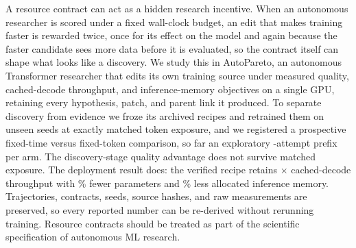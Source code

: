 A resource contract can act as a hidden research incentive.
When an autonomous researcher is scored under a fixed wall-clock budget, an edit that makes training faster is rewarded twice, once for its effect on the model and again because the faster candidate sees more data before it is evaluated, so the contract itself can shape what looks like a discovery.
We study this in AutoPareto, an autonomous Transformer researcher that edits its own training source under measured quality, cached-decode throughput, and inference-memory objectives on a single GPU, retaining every hypothesis, patch, and parent link it produced.
To separate discovery from evidence we froze its archived recipes and retrained them on unseen seeds at exactly matched token exposure, and we registered a prospective fixed-time versus fixed-token comparison, so far an exploratory \TimeN{}-attempt prefix per arm.
The discovery-stage quality advantage does not survive matched exposure.
The deployment result does: the verified recipe retains \DecodeRatio$\times$ cached-decode throughput with \ParameterReduction\% fewer parameters and \MemoryReduction\% less allocated inference memory.
Trajectories, contracts, seeds, source hashes, and raw measurements are preserved, so every reported number can be re-derived without rerunning training.
Resource contracts should be treated as part of the scientific specification of autonomous ML research.
